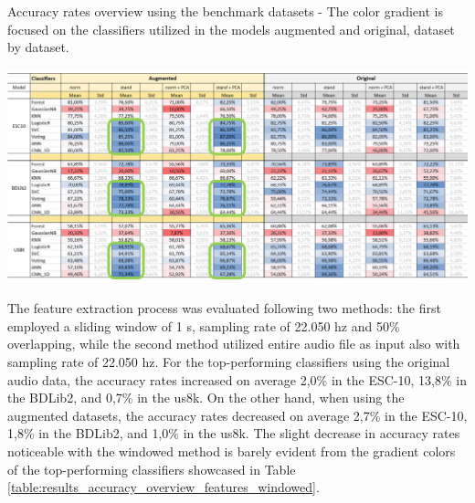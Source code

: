 \begin{table}[ht!]
    \caption[Accuracy rates overview using the benchmark datasets - Models augmented x original (Focus on the classifiers dataset by dataset)]{Accuracy rates overview using the benchmark datasets - The color gradient is focused on the classifiers utilized in the models augmented and original, dataset by dataset.}
    \label{table:results_accuracy_overview_classifiers_aug_ori_2}
     \raggedright
    \includegraphics[width=1\textwidth]{resources/images/060-results/Results_classification_overview_aug_x_ori_2.png}
\end{table}

The feature extraction process was evaluated following two methods: the first employed a sliding window of 1 \gls{s}, sampling rate of 22.050 \gls{hz} and 50\% overlapping, while the second method utilized entire audio file as input also with sampling rate of 22.050 \gls{hz}. For the top-performing classifiers using the original audio data, the accuracy rates increased on average 2,0\% in the ESC-10, 13,8\% in the BDLib2, and 0,7\% in the \gls{us8k}. On the other hand, when using the augmented datasets, the accuracy rates decreased on average 2,7\% in the ESC-10, 1,8\% in the BDLib2, and 1,0\% in the \gls{us8k}. The slight decrease in accuracy rates noticeable with the windowed method is barely evident from the gradient colors of the top-performing classifiers showcased in Table \ref{table:results_accuracy_overview_features_windowed}.




